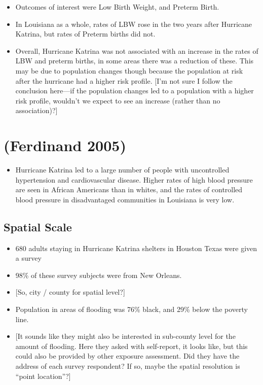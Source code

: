 \documentclass[
]{article}
\providecommand{\tightlist}{%
  \setlength{\itemsep}{0pt}\setlength{\parskip}{0pt}}
\begin{document}
\begin{itemize}
\tightlist
\item
  Outcomes of interest were Low Birth Weight, and Preterm Birth.
\item
  In Louisiana as a whole, rates of LBW rose in the two years after
  Hurricane Katrina, but rates of Preterm births did not.
\item
  Overall, Hurricane Katrina was not associated with an increase in the
  rates of LBW and preterm births, in some areas there was a reduction
  of these. This may be due to population changes though because the
  population at risk after the hurricane had a higher risk profile.
  {[}I'm not sure I follow the conclusion here---if the population
  changes led to a population with a higher risk profile, wouldn't we
  expect to see an increase (rather than no association)?{]}
\end{itemize}

\hypertarget{ferdinand2005hurricane}{%
\section{(Ferdinand 2005)}\label{ferdinand2005hurricane}}

\begin{itemize}
\tightlist
\item
  Hurricane Katrina led to a large number of people with uncontrolled
  hypertension and cardiovascular disease. Higher rates of high blood
  pressure are seen in African Americans than in whites, and the rates
  of controlled blood pressure in disadvantaged communities in Louisiana
  is very low.
\end{itemize}

\hypertarget{spatial-scale-15}{%
\subsection{Spatial Scale}\label{spatial-scale-15}}

\begin{itemize}
\tightlist
\item
  680 adults staying in Hurricane Katrina shelters in Houston Texas were
  given a survey
\item
  98\% of these survey subjects were from New Orleans.
\item
  {[}So, city / county for spatial level?{]}
\item
  Population in areas of flooding was 76\% black, and 29\% below the
  poverty line.
\item
  {[}It sounds like they might also be interested in sub-county level
  for the amount of flooding. Here they asked with self-report, it looks
  like, but this could also be provided by other exposure assessment.
  Did they have the address of each survey respondent? If so, maybe the
  spatial resolution is ``point location''?{]}
\end{itemize}
\end{document}
